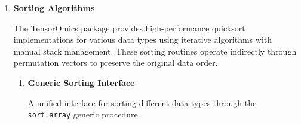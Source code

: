 \begin{enumerate}
\begin{itemize}
            \item Automatic resizing when load factor exceeds 0.75
                  
            \item Separate chaining collision resolution
                  
            \item Table sizes are powers of two for efficient modulo operations
                  
            \item Keys are automatically trimmed and normalized
                  
            \item Memory efficient with proper cleanup procedures
                  
            \item Thread-safe for read operations (concurrent writes not supported)
          \end{itemize}
          
          \textbf{Performance Characteristics:}
          \begin{itemize}
            \item Average case O(1) for insertions and lookups
                  
            \item Memory usage proportional to number of elements + overhead
                  
            \item Resizing operations are O(n) but amortized over many insertions
          \end{itemize}
          
    \item \textbf{Sorting Algorithms}
          
          The TensorOmics package provides high-performance quicksort implementations
          for various data types using iterative algorithms with manual stack management.
          These sorting routines operate indirectly through permutation vectors to
          preserve the original data order.
          
          \begin{enumerate}
            \item \textbf{Generic Sorting Interface}
                  
                  A unified interface for sorting different data types through the \texttt{sort\_array}
                  generic procedure.
                  

\end{enumerate}
\end{enumerate}
